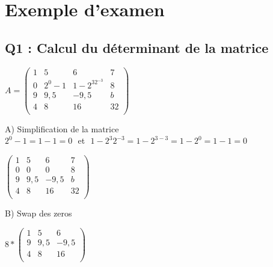 
\newpage
\chapter{Exemple d'examen}
\section{Q1 : Calcul du déterminant de la matrice}

\vspace{5mm} %

$
A =
\begin{pmatrix}
  1 & 5 & 6 & 7 \\
  0 & 2^0-1 & 1-2^32^{-3} & 8 \\
  9 & 9,5 & -9,5 & b \\
  4 & 8 & 16 & 32 \\
\end{pmatrix}
$

\vspace{10mm} %

A) Simplification de la matrice \\

\vspace{2mm} %
$2^{0}-1 = 1-1 = 0$ $ $ et  $ $ $1-2^{3} 2^{-3} = 1-2^{3-3} = 1-2^{0} = 1-1 = 0$
\vspace{4mm} %

$
\begin{pmatrix}
  1 & 5 & 6 & 7 \\
  0 & 0 & 0 & 8 \\
  9 & 9,5 & -9,5 & b \\
  4 & 8 & 16 & 32 \\
\end{pmatrix}
$

\vspace{10mm} %

B) Swap des zeros\\

\vspace{5mm} %

$
8*
\begin{pmatrix}
  1 & 5 & 6 \\
  9 & 9,5 & {-9,5} \\
  4 & 8 & 16 \\
\end{pmatrix}
$

\vspace{10mm} %

